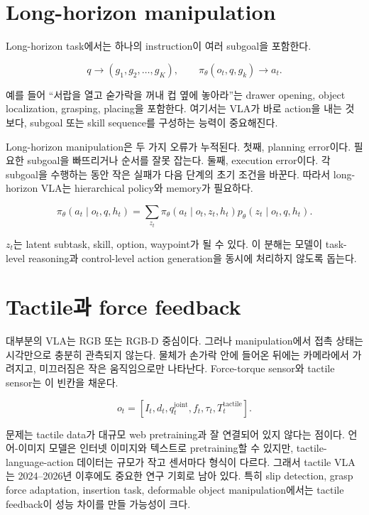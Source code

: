 \section{Long-horizon manipulation}

Long-horizon task에서는 하나의 instruction이 여러 subgoal을 포함한다.

\begin{equation}
  q
  \rightarrow
  (g_1, g_2, \ldots, g_K),
  \qquad
  \pi_\theta(o_t, q, g_k) \rightarrow a_t.
\end{equation}

예를 들어 ``서랍을 열고 숟가락을 꺼내 컵 옆에 놓아라''는 drawer opening, object localization, grasping, placing을 포함한다. 여기서는 VLA가 바로 action을 내는 것보다, subgoal 또는 skill sequence를 구성하는 능력이 중요해진다.

Long-horizon manipulation은 두 가지 오류가 누적된다. 첫째, planning error이다. 필요한 subgoal을 빠뜨리거나 순서를 잘못 잡는다. 둘째, execution error이다. 각 subgoal을 수행하는 동안 작은 실패가 다음 단계의 초기 조건을 바꾼다. 따라서 long-horizon VLA는 hierarchical policy와 memory가 필요하다.

\begin{equation}
  \pi_\theta(a_t \mid o_t,q,h_t)
  =
  \sum_{z_t}
  \pi_\theta(a_t \mid o_t,z_t,h_t)
  p_\theta(z_t \mid o_t,q,h_t).
\end{equation}

$z_t$는 latent subtask, skill, option, waypoint가 될 수 있다. 이 분해는 모델이 task-level reasoning과 control-level action generation을 동시에 처리하지 않도록 돕는다.

\section{Tactile과 force feedback}

대부분의 VLA는 RGB 또는 RGB-D 중심이다. 그러나 manipulation에서 접촉 상태는 시각만으로 충분히 관측되지 않는다. 물체가 손가락 안에 들어온 뒤에는 카메라에서 가려지고, 미끄러짐은 작은 움직임으로만 나타난다. Force-torque sensor와 tactile sensor는 이 빈칸을 채운다.

\begin{equation}
  o_t =
  \left[
    I_t,
    d_t,
    q_t^{\mathrm{joint}},
    f_t,
    \tau_t,
    T_t^{\mathrm{tactile}}
  \right].
\end{equation}

문제는 tactile data가 대규모 web pretraining과 잘 연결되어 있지 않다는 점이다. 언어-이미지 모델은 인터넷 이미지와 텍스트로 pretraining할 수 있지만, tactile-language-action 데이터는 규모가 작고 센서마다 형식이 다르다. 그래서 tactile VLA는 2024--2026년 이후에도 중요한 연구 기회로 남아 있다. 특히 slip detection, grasp force adaptation, insertion task, deformable object manipulation에서는 tactile feedback이 성능 차이를 만들 가능성이 크다.

